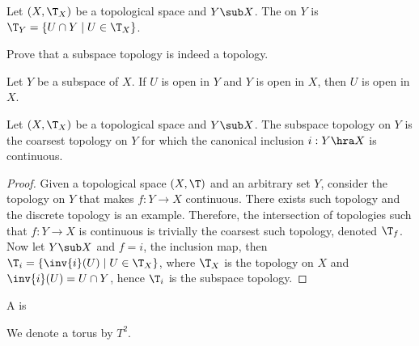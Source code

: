 \documentclass[10pt]{article}
\begin{document}
\begin{definition}
    Let $(X,{\T}_{X})$ be a topological space and $Y\sub X$. The  on $Y$ is ${\T}_{Y}=\{U\cap Y\mid U\in{\T}_{X}\}$.
\end{definition}
\begin{problem}
    Prove that a subspace topology is indeed a topology.
\end{problem}
\begin{problem}
    Let $Y$ be a subspace of $X$. If $U$ is open in $Y$ and $Y$ is open in $X$, then $U$ is open in $X$.
\end{problem}
\begin{proposition}
    Let $(X,{\T}_{X})$ be a topological space and $Y\sub X$. The subspace topology on $Y$ is the coarsest topology on $Y$ for which the canonical inclusion $i:Y\hra X$ is continuous.
\end{proposition}
\begin{proof}
    Given a topological space $(X,{\T})$ and an arbitrary set $Y$, consider the topology on $Y$ that makes $f:Y\to X$ continuous. There exists such topology and the discrete topology is an example. Therefore, the intersection of topologies such that $f:Y\to X$ is continuous is trivially the coarsest such topology, denoted ${\T}_{f}$. Now let $Y\sub X$ and $f=i$, the inclusion map, then ${\T}_{i}=\{\inv{i}(U)\mid U\in{\T}_{X}\}$, where ${\T}_{X}$ is the topology on $X$ and $\inv{i}(U)=U\cap Y$, hence ${\T}_{i}$ is the subspace topology.
\end{proof}
\begin{definition}
    
\end{definition}
\begin{example}
    A  is 

    We denote a torus by ${T}^{2}$.
\end{example}


\newpage
\end{document}
